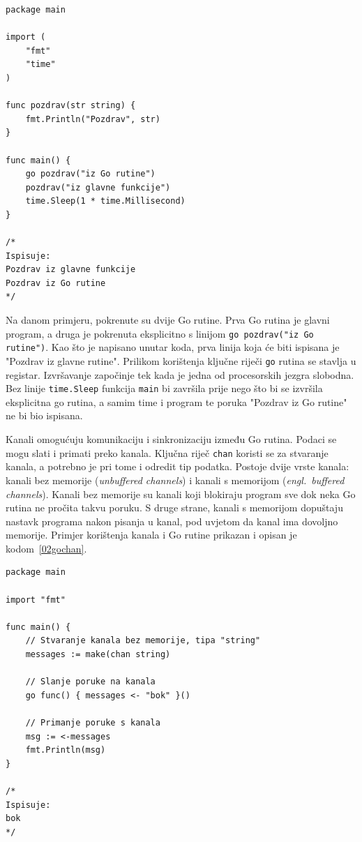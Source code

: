 \begin{lstlisting}[float=h]
package main

import (
    "fmt"
    "time"
)

func pozdrav(str string) {
    fmt.Println("Pozdrav", str)
}

func main() {
    go pozdrav("iz Go rutine")
    pozdrav("iz glavne funkcije")
    time.Sleep(1 * time.Millisecond)
}

/*
Ispisuje:
Pozdrav iz glavne funkcije
Pozdrav iz Go rutine
*/
\end{lstlisting}

Na danom primjeru, pokrenute su dvije Go rutine. Prva Go rutina je glavni program, a druga je
pokrenuta eksplicitno s linijom \texttt{go pozdrav("iz Go rutine")}. Kao što je napisano unutar
koda, prva linija koja će biti ispisana je "Pozdrav iz glavne rutine". Prilikom korištenja ključne
riječi \texttt{go} rutina se stavlja u registar. Izvršavanje započinje tek kada je jedna od
procesorskih jezgra slobodna. Bez linije \texttt{time.Sleep} funkcija \texttt{main} bi završila
prije nego što bi se izvršila eksplicitna go rutina, a samim time i program te poruka "Pozdrav iz Go
rutine" ne bi bio ispisana.

Kanali omogućuju komunikaciju i sinkronizaciju između Go rutina. Podaci se mogu slati i primati
preko kanala. Ključna riječ \texttt{chan} koristi se za stvaranje kanala, a potrebno je pri tome i
odredit tip podatka. Postoje dvije vrste kanala: kanali bez memorije (\textit{unbuffered channels})
i kanali s memorijom (\textit{engl.~buffered channels}). Kanali bez memorije su kanali koji
blokiraju program sve dok neka Go rutina ne pročita takvu poruku. S druge strane, kanali s memorijom
dopuštaju nastavk programa nakon pisanja u kanal, pod uvjetom da kanal ima dovoljno memorije.
Primjer korištenja kanala i Go rutine prikazan i opisan je kodom~\ref{02gochan}.

\begin{lstlisting}[float=h]
package main

import "fmt"

func main() {
    // Stvaranje kanala bez memorije, tipa "string"
    messages := make(chan string)

    // Slanje poruke na kanala
    go func() { messages <- "bok" }()

    // Primanje poruke s kanala
    msg := <-messages
    fmt.Println(msg)
}

/*
Ispisuje:
bok
*/
\end{lstlisting}


